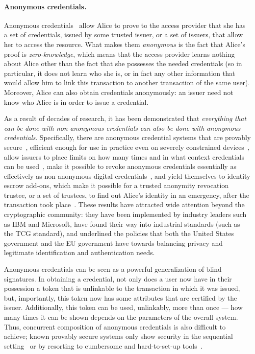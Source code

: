 \paragraph{Anonymous credentials.} Anonymous credentials~\cite{chaum85,lrsw99,camlys01a,lysyan02a,camlys04} allow Alice to prove to
the access provider that she has a set of credentials, issued by some
trusted issuer, or a set of issuers, that allow her to access the
resource.  What makes them \emph{anonymous} is the fact that Alice's
proof is \emph{zero-knowledge}, which means that the access provider
learns nothing about Alice other than the fact that she possesses the
needed credentials (so in particular, it does not learn who she is, or
in fact any other information that would allow him to link this
transaction to another transaction of the same user).  Moreover, Alice
can also obtain credentials anonymously: an issuer need not know who
Alice is in order to issue a credential.

As a result of decades of research, it has been demonstrated that \emph{everything that can be done with non-anonymous credentials can also be done with anonymous credentials}.  Specifically, there are anonymous credential
systems that are provably secure~\cite{lrsw99,lysyan02a,camlys02b},
efficient enough for use in practice even on severely constrained
devices~\cite{bhrlpb12,CCS:BalLys13}, allow issuers to place limits on how many
times and in what context credentials can be
used~\cite{caholy05,chklm06}, make it possible to revoke anonymous
credentials essentially as effectively as non-anonymous digital
credentials~\cite{camlys02a,lipeyu12a,lipeyu12b}, and yield themselves
to identity escrow add-ons, which make it possible for a trusted
anonymity revocation trustee, or a set of trustees, to find out
Alice's identity in an emergency, after the transaction took
place~\cite{bacaly04}.  These results have attracted wide attention
beyond the cryptographic community: they have been implemented by
industry leaders such as IBM and Microsoft, have found their way into
industrial standards (such as the TCG standard), and underlined the
policies that both the United States government and the EU government
have towards balancing privacy and legitimate identification and
authentication needs.  

Anonymous credentials can be seen as a powerful generalization of blind signatures.  In obtaining a credential, not only does a user now have in their possession a token that is unlinkable to the transaction in which it was issued, but, importantly, this token now has some attributes that are certified by the issuer.  Additionally, this token can be used, unlinkably, more than once --- how many times it can be shown depends on the parameters of the overall system.  Thus, concurrent composition of anonymous credentials is also difficult to achieve; known provably secure systems only show security in the sequential setting~\cite{} or by resorting to cumbersome and hard-to-set-up tools~\cite{}. 

